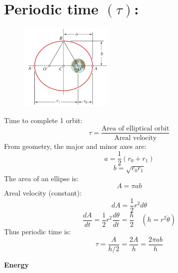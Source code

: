 \documentclass[10pt, fleqn]{article}
\begin{document}
\section*{Periodic time $(\tau)$:} 
\begin{figure}[H]
    \centering
    \includegraphics[width=0.4\textwidth]{periodic time.png}
\end{figure}
Time to complete 1 orbit:
\[\tau=\frac{\text{Area of elliptical orbit}}{\text{Areal velocity}}\]
From geometry, the major and minor axes are:
\[a = \frac{1}{2}(r_0 + r_1)\]
\[b = \sqrt{r_0r_1}\]
The area of an ellipse is:
\[A=\pi ab\]
Areal velocity (constant):
\[dA=\frac{1}{2}r^2d\theta\]
\[\frac{dA}{dt}=\frac{1}{2}r^2\frac{d\theta}{dt}=\frac{h}{2} \quad (h=r^2\dot{\theta})\]
Thus periodic time is:
\[\boxed{\tau = \frac{A}{h/2} = \frac{2A}{h} = \frac{2\pi ab}{h}}\] 
\newpage
\begin{center}
    \Large \textbf{Energy}
\end{center}
\makeatletter
\@fleqntrue
\makeatother
\end{document}
